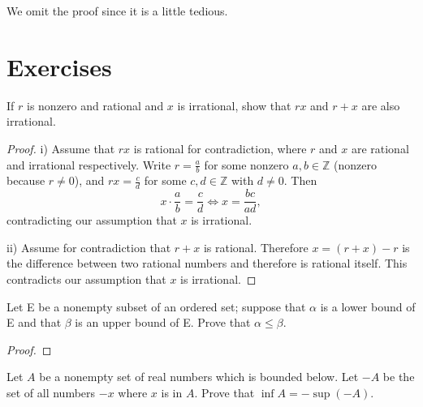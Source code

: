 We omit the proof since it is a little tedious.



\section{Exercises}

  If $r$ is nonzero and rational and $x$ is irrational, show that $rx$ and $r+x$ are also irrational. 

\begin{proof}
	i) Assume that $rx$ is rational for contradiction, where $r$ and $x$ are rational and irrational respectively.  Write $r = \frac{a}{b}$
 for some nonzero $a,b \in \mathbb{Z}$ (nonzero because $r \neq 0$), and $rx = \frac{c}{d}$ for some $c,d \in \mathbb{Z}$ with $d \neq 0$.  Then
 \[x \cdot \frac{a}{b} = \frac{c}{d} \iff x = \frac{bc}{ad},\]
 contradicting our assumption that $x$ is irrational.
 
 ii) Assume for contradiction that $r+x$ is rational. Therefore $x = (r+x) - r$ is the difference between two rational numbers and therefore is rational itself.  This contradicts our assumption that $x$ is irrational.
 \end{proof}
 
  Let E be a nonempty subset of an ordered set; suppose that $\alpha$ is a lower bound of E and that $\beta$ is an upper bound of E.  Prove that $\alpha \leq \beta$.

\begin{proof}
\end{proof}


  Let $A$ be a nonempty set of real numbers which is bounded below.  Let $-A$ be the set of all numbers $-x$ where $x$ is in $A$.  Prove that $\inf A = -\sup(-A)$.


